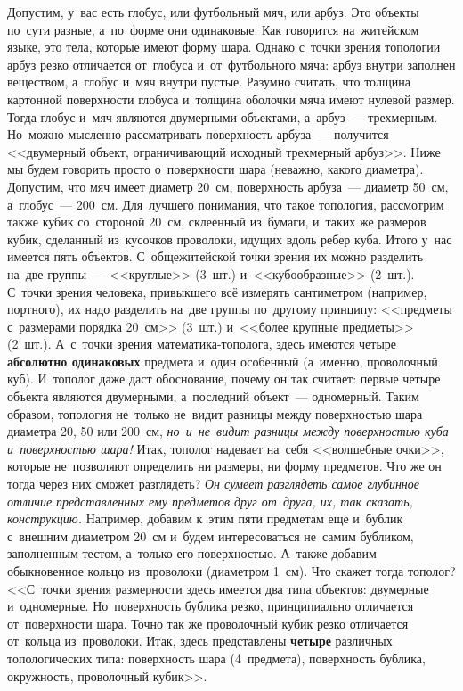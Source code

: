 Допустим, у~вас есть глобус, или футбольный мяч, или арбуз. Это объекты по~сути разные, а~по~форме
они одинаковые. Как говорится на~житейском языке, это тела, которые имеют форму шара. Однако с~точки зрения
топологии арбуз резко отличается от~глобуса и~от~футбольного мяча: арбуз внутри заполнен веществом,
а~глобус и~мяч внутри пустые. Разумно считать, что толщина картонной поверхности глобуса и~толщина
оболочки мяча имеют нулевой размер. Тогда глобус и~мяч являются двумерными объектами, а~арбуз~---
трехмерным. Но~можно мысленно рассматривать поверхность арбуза~--- получится <<двумерный объект,
ограничивающий исходный трехмерный арбуз>>. Ниже мы будем говорить просто о~поверхности шара (неважно,
какого диаметра).
 Допустим, что мяч имеет диаметр 20~см, поверхность арбуза~--- диаметр 50~см,
а~глобус~--- 200~см. Для~лучшего понимания, что такое топология, рассмотрим также кубик со~стороной
20~см, склеенный из~бумаги, и~таких же размеров кубик, сделанный из~кусочков проволоки, идущих
вдоль ребер куба. Итого у~нас имеется пять объектов. С~общежитейской точки зрения их можно
разделить на~две группы~--- <<круглые>> (3~шт.) и~<<кубообразные>> (2~шт.). С~точки зрения человека,
привыкшего всё измерять сантиметром (например, портного), их надо разделить на~две группы
по~другому принципу: <<предметы с~размерами порядка 20~см>> (3~шт.) и~<<более крупные предметы>> (2~шт.).
А~с~точки зрения математика-тополога, здесь имеются четыре \textbf{абсолютно одинаковых} предмета
и~один особенный (а~именно, проволочный куб). И~тополог даже даст обоснование, почему он так
считает: первые четыре объекта являются двумерными, а~последний объект~--- одномерный. Таким
образом, топология не~только не~видит разницы между поверхностью шара диаметра 20, 50 или 200~см,
\textit{но~и~не~видит разницы между поверхностью куба и~поверхностью шара!} Итак, тополог надевает на~себя
<<волшебные очки>>, которые не~позволяют определить ни размеры, ни форму предметов. Что же он тогда
через них сможет разглядеть?
 \textit{Он сумеет разглядеть самое глубинное отличие представленных ему
предметов друг от~друга, их, так сказать, конструкцию.} Например, добавим к~этим пяти предметам еще
и~бублик с~внешним диаметром 20~см и~будем интересоваться не~самим бубликом, заполненным тестом,
а~только его поверхностью. А~также добавим обыкновенное кольцо из~проволоки (диаметром 1~см). Что
скажет тогда тополог? <<С~точки зрения размерности здесь имеется два типа объектов: двумерные
и~одномерные. Но~поверхность бублика резко, принципиально отличается от~поверхности шара. Точно
так же проволочный кубик резко отличается от~кольца из~проволоки. Итак, здесь представлены \textbf{четыре}
различных топологических типа: поверхность шара (4~предмета), поверхность бублика, окружность,
проволочный кубик>>.

